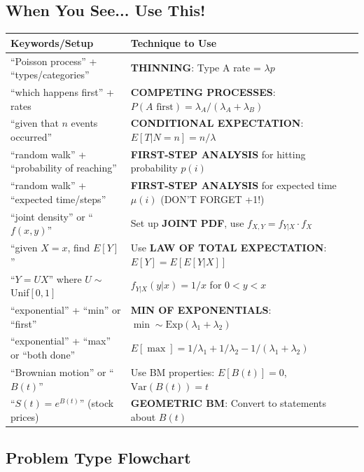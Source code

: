 \documentclass[10pt,letterpaper]{article}
\begin{document}
\subsection{When You See... Use This!}

\begin{table}[h]
\centering
\small
\begin{tabularx}{\textwidth}{lX}
\toprule
\textbf{Keywords/Setup} & \textbf{Technique to Use} \\
\midrule
``Poisson process'' + ``types/categories'' & \textbf{THINNING}: Type A rate = $\lambda p$ \\
\midrule
``which happens first'' + rates & \textbf{COMPETING PROCESSES}: $P(A \text{ first}) = \lambda_A/(\lambda_A + \lambda_B)$ \\
\midrule
``given that $n$ events occurred'' & \textbf{CONDITIONAL EXPECTATION}: $E[T|N=n] = n/\lambda$ \\
\midrule
``random walk'' + ``probability of reaching'' & \textbf{FIRST-STEP ANALYSIS} for hitting probability $p(i)$ \\
\midrule
``random walk'' + ``expected time/steps'' & \textbf{FIRST-STEP ANALYSIS} for expected time $\mu(i)$ (DON'T FORGET +1!) \\
\midrule
``joint density'' or ``$f(x,y)$'' & Set up \textbf{JOINT PDF}, use $f_{X,Y} = f_{Y|X} \cdot f_X$ \\
\midrule
``given $X=x$, find $E[Y]$'' & Use \textbf{LAW OF TOTAL EXPECTATION}: $E[Y] = E[E[Y|X]]$ \\
\midrule
``$Y = UX$'' where $U \sim$ Unif$[0,1]$ & $f_{Y|X}(y|x) = 1/x$ for $0 < y < x$ \\
\midrule
``exponential'' + ``min'' or ``first'' & \textbf{MIN OF EXPONENTIALS}: $\min \sim \text{Exp}(\lambda_1 + \lambda_2)$ \\
\midrule
``exponential'' + ``max'' or ``both done'' & $E[\max] = 1/\lambda_1 + 1/\lambda_2 - 1/(\lambda_1+\lambda_2)$ \\
\midrule
``Brownian motion'' or ``$B(t)$'' & Use BM properties: $E[B(t)] = 0$, $\text{Var}(B(t)) = t$ \\
\midrule
``$S(t) = e^{B(t)}$'' (stock prices) & \textbf{GEOMETRIC BM}: Convert to statements about $B(t)$ \\
\bottomrule
\end{tabularx}
\end{table}

\subsection{Problem Type Flowchart}
\end{document}
